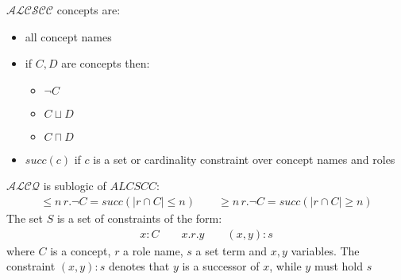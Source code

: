 \documentclass[a4paper,11pt]{scrartcl}
\theoremstyle{definition}
\begin{document}
$\mathcal{ALCSCC}$ concepts are:
\begin{itemize}
\item all concept names
\item if $C,D$ are concepts then:
\begin{itemize}
\item $\neg C$
\item $C\sqcup D$
\item $C\sqcap D$
\end{itemize}
\item $succ(c)$ if $c$ is a set or cardinality constraint over concept names and roles 
\end{itemize}
$\mathcal{ALCQ}$ is sublogic of $ALCSCC$:
\begin{align*}
\leq n\,r.\neg C = succ(|r\cap C|\leq n)\quad\quad \geq n\,r.\neg C = succ(|r\cap C|\geq n)
\end{align*}
The set $S$ is a set of constraints of the form:
\begin{align*}
x:C\quad\quad x.r.y\quad\quad (x,y):s
\end{align*}
where $C$ is a concept, $r$ a role name, $s$ a set term and $x,y$ variables. The constraint $(x,y):s$ denotes that $y$ is a successor of $x$, while $y$ must hold $s$\\
\end{document}
